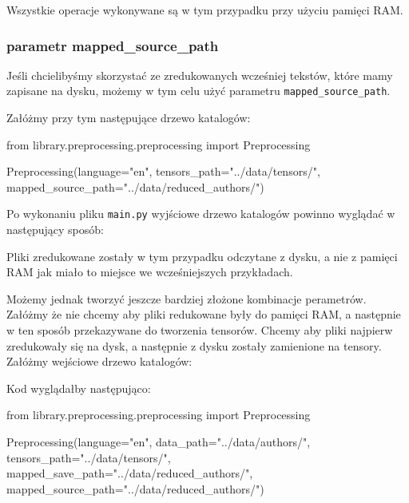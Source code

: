 Wszystkie operacje wykonywane są w tym przypadku przy użyciu pamięci RAM.

\newpage
\subsubsection{parametr mapped\_source\_path}
Jeśli chcielibyśmy skorzystać ze zredukowanych wcześniej tekstów, które mamy zapisane na dysku, 
możemy w tym celu użyć parametru \texttt{mapped\_source\_path}.

Załóżmy przy tym następujące drzewo katalogów:
\myspace
{}
\myspace

\begin{python}
from library.preprocessing.preprocessing import Preprocessing

Preprocessing(language="en",
              tensors_path="../data/tensors/",
              mapped_source_path="../data/reduced_authors/")
                   
\end{python}

Po wykonaniu pliku \texttt{main.py} wyjściowe drzewo katalogów powinno wyglądać w następujący sposób:
\myspace
{}
\myspace

Pliki zredukowane zostały w tym przypadku odczytane z dysku, a nie z pamięci RAM jak miało to miejsce
we wcześniejszych przykładach. 
\newline

Możemy jednak tworzyć jeszcze bardziej złożone kombinacje perametrów. Załóżmy że nie chcemy aby pliki redukowane były
do pamięci RAM, a następnie w ten sposób przekazywane do tworzenia tensorów. Chcemy aby pliki najpierw
zredukowały się na dysk, a następnie z dysku zostały zamienione na tensory. 
Załóżmy wejściowe drzewo katalogów:

\myspace
{}
\myspace

Kod wyglądałby następująco:
\begin{python}
from library.preprocessing.preprocessing import Preprocessing

Preprocessing(language="en",
              data_path="../data/authors/",
              tensors_path="../data/tensors/",
              mapped_save_path="../data/reduced_authors/",
              mapped_source_path="../data/reduced_authors/")

\end{python}

